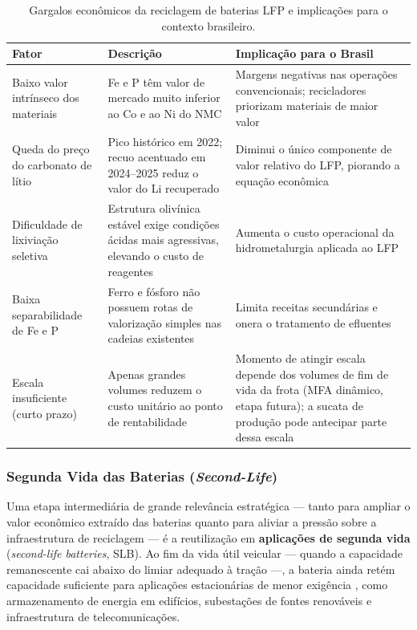 \begin{table}[H]
\centering
\caption{Gargalos econômicos da reciclagem de baterias LFP e implicações para o
         contexto brasileiro.}
\label{tab:lfp-gargalos}
\small
\renewcommand{\arraystretch}{1.2}
\begin{tabularx}{\textwidth}{@{} p{3cm} X X @{}}
\toprule
\textbf{Fator} & \textbf{Descrição} & \textbf{Implicação para o Brasil} \\
\midrule
Baixo valor intrínseco dos materiais &
Fe e P têm valor de mercado muito inferior ao Co e ao Ni do NMC &
Margens negativas nas operações convencionais; recicladores priorizam
materiais de maior valor \\
\addlinespace
Queda do preço do carbonato de lítio &
Pico histórico em 2022; recuo acentuado em 2024--2025 reduz o valor do Li
recuperado &
Diminui o único componente de valor relativo do LFP, piorando a equação econômica \\
\addlinespace
Dificuldade de lixiviação seletiva &
Estrutura olivínica estável exige condições ácidas mais agressivas, elevando o
custo de reagentes &
Aumenta o custo operacional da hidrometalurgia aplicada ao LFP \\
\addlinespace
Baixa separabilidade de Fe e P &
Ferro e fósforo não possuem rotas de valorização simples nas cadeias existentes &
Limita receitas secundárias e onera o tratamento de efluentes \\
\addlinespace
Escala insuficiente (curto prazo) &
Apenas grandes volumes reduzem o custo unitário ao ponto de rentabilidade &
Momento de atingir escala depende dos volumes de fim de vida da frota (MFA
dinâmico, etapa futura); a sucata de produção pode antecipar parte dessa escala \\
\bottomrule
\end{tabularx}
\end{table}

\subsubsection{Segunda Vida das Baterias (\textit{Second-Life})}
\label{subsec:secondlife}

Uma etapa intermediária de grande relevância estratégica — tanto para ampliar o
valor econômico extraído das baterias quanto para aliviar a pressão sobre a
infraestrutura de reciclagem — é a reutilização em \textbf{aplicações de segunda
vida} (\textit{second-life batteries}, SLB). Ao fim da vida útil veicular — quando
a capacidade remanescente cai abaixo do limiar adequado à tração
 —, a
bateria ainda retém capacidade suficiente para aplicações estacionárias de menor
exigência \cite{moseley2019}, como armazenamento de energia em edifícios,
subestações de fontes renováveis e infraestrutura de telecomunicações.

